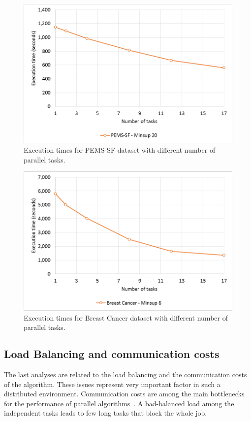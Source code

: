 \begin{figure}[!t]
\includegraphics[width=5in]{chapters/pampa/immagini_extension/scalability_pems.png}
\caption{Execution times for PEMS-SF dataset with different number of parallel tasks.}
\label{scalability_img_pems}
\end{figure}

\begin{figure}[!t]
\includegraphics[width=5in]{chapters/pampa/immagini_extension/scalability_breast.png}
\caption{Execution times for Breast Cancer dataset with different number of parallel tasks.}
\label{scalability_img_breast}
\end{figure}


\subsection{Load Balancing and communication costs}\label{communication_cost}
The last analyses are related to the load balancing and the communication costs of the algorithm. These issues represent very important factor in such a distributed environment. Communication costs are among the main bottlenecks for the performance of parallel  algorithms~\cite{Sarma:2013:ULB:2535570.2488334}.
A bad-balanced load among the independent tasks leads to few long tasks that block the whole job.

